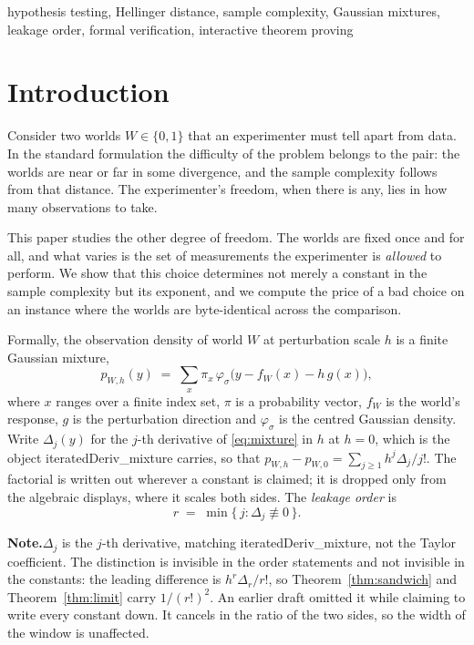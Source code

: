 \documentclass[conference]{IEEEtran}
\theoremstyle{definition}
\newcommand{\lean}[1]{\textsf{\footnotesize #1}}
\newif\ifshownotes\shownotestrue
\newcommand{\NOTEPAR}[1]{\ifshownotes\par\vspace{2pt}\noindent%
  {\color{notecol}\textsf{\footnotesize\textbf{Note.}\;#1}}\par\vspace{2pt}\fi}
\begin{document}
\begin{IEEEkeywords}
hypothesis testing, Hellinger distance, sample complexity, Gaussian mixtures, leakage order,
formal verification, interactive theorem proving
\end{IEEEkeywords}

\section{Introduction}

Consider two worlds $W\in\{0,1\}$ that an experimenter must tell apart from data. In the
standard formulation the difficulty of the problem belongs to the pair: the worlds are near
or far in some divergence, and the sample complexity follows from that distance. The
experimenter's freedom, when there is any, lies in how many observations to take.

This paper studies the other degree of freedom. The worlds are fixed once and for all, and
what varies is the set of measurements the experimenter is \emph{allowed} to perform. We
show that this choice determines not merely a constant in the sample complexity but its
exponent, and we compute the price of a bad choice on an instance where the worlds are
byte-identical across the comparison.

Formally, the observation density of world $W$ at perturbation scale $h$ is a finite
Gaussian mixture,
\begin{equation}
p_{W,h}(y)\;=\;\sum_{x}\pi_{x}\,
   \varphi_{\sigma}\bigl(y-f_{W}(x)-h\,g(x)\bigr),
\label{eq:mixture}
\end{equation}
where $x$ ranges over a finite index set, $\pi$ is a probability vector, $f_{W}$ is the
world's response, $g$ is the perturbation direction and $\varphi_{\sigma}$ is the centred
Gaussian density. Write $\Delta_{j}(y)$ for the $j$-th derivative of \eqref{eq:mixture} in
$h$ at $h=0$, which is the object \lean{iteratedDeriv\_mixture} carries, so that
$p_{W,h}-p_{W,0}=\sum_{j\ge1}h^{j}\Delta_{j}/j!$. The factorial is written out wherever a
constant is claimed; it is dropped only from the algebraic displays, where it scales both
sides. The \emph{leakage order} is
\begin{equation}
r \;=\; \min\{\, j : \Delta_{j}\not\equiv 0 \,\}.
\label{eq:order}
\end{equation}
\NOTEPAR{$\Delta_{j}$ is the $j$-th derivative, matching \lean{iteratedDeriv\_mixture},
not the Taylor coefficient. The distinction is invisible in the order statements and not
invisible in the constants: the leading difference is $h^{r}\Delta_{r}/r!$, so
Theorem~\ref{thm:sandwich} and Theorem~\ref{thm:limit} carry $1/(r!)^{2}$. An earlier draft
omitted it while claiming to write every constant down. It cancels in the ratio of the two
sides, so the width of the window is unaffected.}
\end{document}
